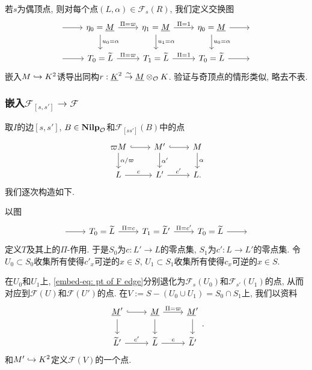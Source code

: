 若$s$为偶顶点, 则对每个点$(L, \alpha)\in \mathcal{F}_s(R)$, 我们定义交换图\[
\begin{tikzcd}
{} \arrow[r] & \eta_0=\underline{M} \arrow[r, "\Pi=\varpi"] \arrow[d, "u_0=\alpha"] & \eta_1=\underline{M} \arrow[r, "\Pi=1"] \arrow[d, "u_1=\alpha"] & \eta_0=\underline{M} \arrow[r] \arrow[d, "u_0=\alpha"] & {} \\
{} \arrow[r] & T_0=\tilde{L} \arrow[r, "\Pi=\varpi"]                         & T_1=\tilde{L} \arrow[r, "\Pi=1"]                         & T_0=\tilde{L} \arrow[r]                         & {}
\end{tikzcd}\]
嵌入$M\hookrightarrow K^2$诱导出同构$r : \underline{K}^2\stackrel{\sim}{\rightarrow}\underline{M}\otimes_{\mathcal{O}} K$.
验证与奇顶点的情形类似, 略去不表.

\subsubsection{嵌入$\mathcal{F}_{[s, s']}\to \mathcal{F}$}

取$I$的边$[s, s']$, $B\in\mathbf{Nilp}_{\mathcal{O}}$和$\mathcal{F}_{[s s']}(B)$中的点
\begin{equation}\label{embed-eq: pt of F edge}
\begin{tikzcd}
\varpi M \arrow[d, "\alpha/\varpi"] \arrow[r, hook] & M' \arrow[r, hook] \arrow[d, "\alpha'"] & M \arrow[d, "\alpha"] \\
L \arrow[r, "c"]                                    & L' \arrow[r, "c'"]                      & L.                   
\end{tikzcd}
\end{equation}
我们逐次构造如下.

以图\[\begin{tikzcd}
{} \arrow[r] & T_0=\tilde{L} \arrow[r, "\Pi=c"] & T_1=\tilde{L}' \arrow[r, "\Pi=c'"] & T_0=\tilde L \arrow[r] & {}
\end{tikzcd}\]定义$T$及其上的$\Pi$-作用.
于是$S_0$为$c : L'\to L$的零点集, $S_1$为$c' : L\to L'$的零点集. 令$U_0\subset S_0$收集所有使得$c'_x$可逆的$x\in S$, $U_1\subset S_1$收集所有使得$c_x$可逆的$x\in S$.

在$U_0$和$U_1$上, \cref{embed-eq: pt of F edge}分别退化为$\mathcal{F}_s(U_0)$和$\mathcal{F}_{s'}(U_1)$的点, 从而对应到$\mathcal{F}(U)$和$\mathcal{F}(U')$的点.
在$V := S - (U_0\cup U_1) = S_0\cap S_1$上, 我们以资料\[
\begin{tikzcd}
\underline{M}' \arrow[d] \arrow[r, hook] & \underline M \arrow[r, "\Pi=\varpi"] \arrow[d] & \underline M' \arrow[d] \\
\tilde L' \arrow[r, "c'"]                & \tilde L \arrow[r, "c"]                        & \tilde L'              
\end{tikzcd}
.\]
和$M'\hookrightarrow K^2$定义$\mathcal{F}(V)$的一个点.

